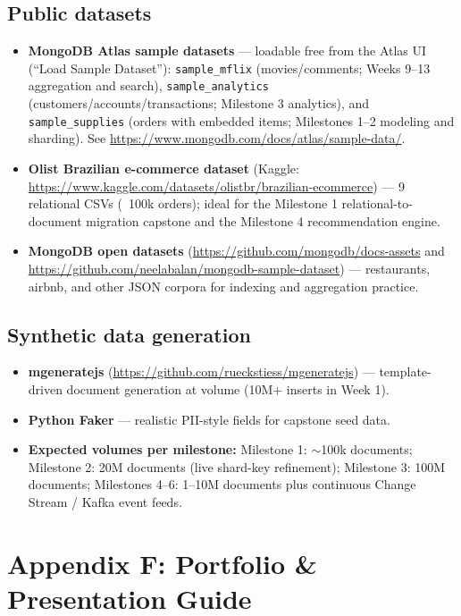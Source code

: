 \documentclass[11pt, a4paper]{article}
\begin{document}
\subsection*{Public datasets}
\begin{itemize}[label=-]
    \item \textbf{MongoDB Atlas sample datasets} --- loadable free from the Atlas UI (``Load Sample Dataset''): \texttt{sample\_mflix} (movies/comments; Weeks 9--13 aggregation and search), \texttt{sample\_analytics} (customers/accounts/transactions; Milestone 3 analytics), and \texttt{sample\_supplies} (orders with embedded items; Milestones 1--2 modeling and sharding). See \url{https://www.mongodb.com/docs/atlas/sample-data/}.
    \item \textbf{Olist Brazilian e-commerce dataset} (Kaggle: \url{https://www.kaggle.com/datasets/olistbr/brazilian-ecommerce}) --- 9 relational CSVs (~100k orders); ideal for the Milestone 1 relational-to-document migration capstone and the Milestone 4 recommendation engine.
    \item \textbf{MongoDB open datasets} (\url{https://github.com/mongodb/docs-assets} and \url{https://github.com/neelabalan/mongodb-sample-dataset}) --- restaurants, airbnb, and other JSON corpora for indexing and aggregation practice.
\end{itemize}

\subsection*{Synthetic data generation}
\begin{itemize}[label=-]
    \item \textbf{mgeneratejs} (\url{https://github.com/rueckstiess/mgeneratejs}) --- template-driven document generation at volume (10M+ inserts in Week 1).
    \item \textbf{Python Faker} --- realistic PII-style fields for capstone seed data.
    \item \textbf{Expected volumes per milestone:} Milestone 1: $\sim$100k documents; Milestone 2: 20M documents (live shard-key refinement); Milestone 3: 100M documents; Milestones 4--6: 1--10M documents plus continuous Change Stream / Kafka event feeds.
\end{itemize}

\section{Appendix F: Portfolio \& Presentation Guide}
\end{document}
